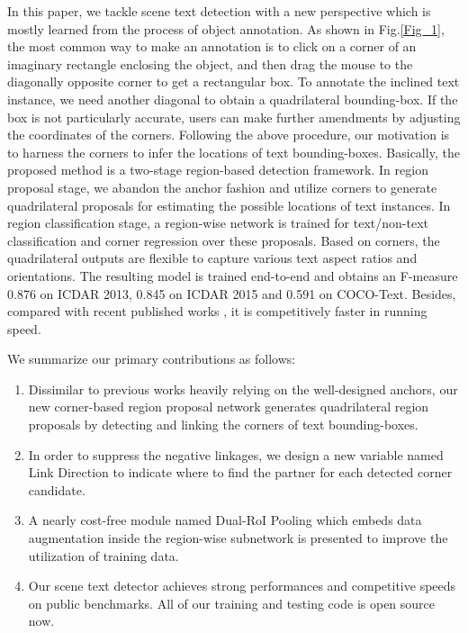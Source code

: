 \documentclass[3p, times]{elsarticle}
\begin{document}
In this paper, we tackle scene text detection with a new perspective which is mostly learned from the process of object annotation. As shown in Fig.\ref{Fig_1}, the most common way \cite{EC2017ICCV, DEC2017ARXIV} to make an annotation is to click on a corner of an imaginary rectangle enclosing the object, and then drag the mouse to the diagonally opposite corner to get a rectangular box. To annotate the inclined text instance, we need another diagonal to obtain a quadrilateral bounding-box. If the box is not particularly accurate, users can make further amendments by adjusting the coordinates of the corners. Following the above procedure, our motivation is to harness the corners to infer the locations of text bounding-boxes. Basically, the proposed method is a two-stage region-based \cite{RCNN2014CVPR} detection framework. In region proposal stage, we abandon the anchor fashion and utilize corners to generate quadrilateral proposals for estimating the possible locations of text instances. In region classification stage, a region-wise network is trained for text/non-text classification and corner regression over these proposals. Based on corners, the quadrilateral outputs are flexible to capture various text aspect ratios and orientations. The resulting model is trained end-to-end and obtains an F-measure 0.876 on ICDAR 2013, 0.845 on ICDAR 2015 and 0.591 on COCO-Text. Besides, compared with recent published works \cite{DDR2017ICCV, SSTD2017ICCV}, it is competitively faster in running speed.

We summarize our primary contributions as follows:

\begin{enumerate}[(1)]
\item Dissimilar to previous works heavily relying on the well-designed anchors, our new corner-based region proposal network generates quadrilateral region proposals by detecting and linking the corners of text bounding-boxes.
\item In order to suppress the negative linkages, we design a new variable named Link Direction to indicate where to find the partner for each detected corner candidate.
\item A nearly cost-free module named Dual-RoI Pooling which embeds data augmentation inside the region-wise subnetwork is presented to improve the utilization of training data.
\item Our scene text detector achieves strong performances and competitive speeds on public benchmarks. All of our training and testing code is open source now.
\end{enumerate}
\end{document}
